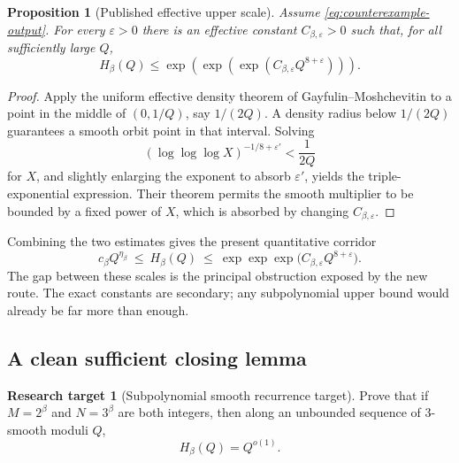 \documentclass[11pt]{article}
\newtheorem{proposition}[theorem]{Proposition}
\theoremstyle{definition}
\newtheorem{problem}[theorem]{Research target}
\theoremstyle{remark}
\begin{document}
\begin{proposition}[Published effective upper scale]\label{prop:effective-upper}
Assume \eqref{eq:counterexample-output}.  For every $\varepsilon>0$ there is an
effective constant $C_{\beta,\varepsilon}>0$ such that, for all sufficiently large
$Q$,
\begin{equation}\label{eq:triple-exp-upper}
 H_\beta(Q)
 \le
 \exp\!\left(\exp\!\left(\exp\!\left(
 C_{\beta,\varepsilon}Q^{8+\varepsilon}
 \right)\right)\right).
\end{equation}
\end{proposition}

\begin{proof}
Apply the uniform effective density theorem of Gayfulin--Moshchevitin to a point in
the middle of $(0,1/Q)$, say $1/(2Q)$.  A density radius below $1/(2Q)$ guarantees
a smooth orbit point in that interval.  Solving
\[
 (\log\log\log X)^{-1/8+\varepsilon'}<\frac1{2Q}
\]
for $X$, and slightly enlarging the exponent to absorb $\varepsilon'$, yields the
triple-exponential expression.  Their theorem permits the smooth multiplier to be
bounded by a fixed power of $X$, which is absorbed by changing
$C_{\beta,\varepsilon}$.
\end{proof}

Combining the two estimates gives the present quantitative corridor
\begin{equation}\label{eq:hitting-corridor}
 c_\beta Q^{\eta_\beta}
 \ \le\ H_\beta(Q)\ \le\
 \exp\exp\exp\bigl(C_{\beta,\varepsilon}Q^{8+\varepsilon}\bigr).
\end{equation}
The gap between these scales is the principal obstruction exposed by the new route.
The exact constants are secondary; any subpolynomial upper bound would already be
far more than enough.

\subsection{A clean sufficient closing lemma}

\begin{problem}[Subpolynomial smooth recurrence target]
\label{target:subpolynomial-hitting}
Prove that if $M=2^\beta$ and $N=3^\beta$ are both integers, then along an unbounded
sequence of $3$-smooth moduli $Q$,
\begin{equation}\label{eq:subpolynomial-target}
 H_\beta(Q)=Q^{o(1)}.
\end{equation}
\end{problem}
\end{document}
